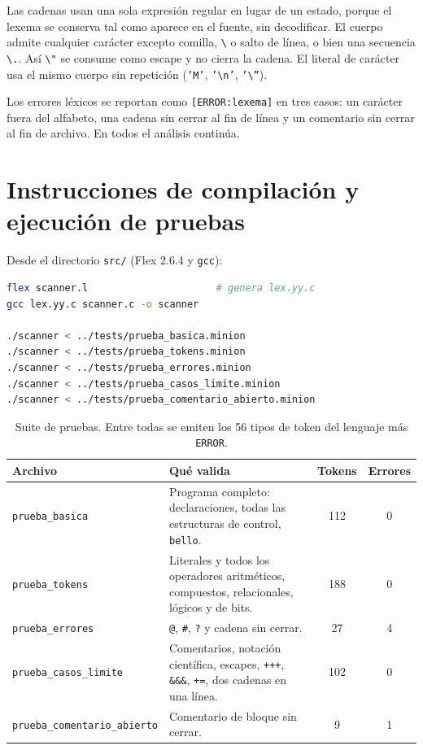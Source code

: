 \documentclass[11pt,letterpaper]{article}
\newcommand{\code}[1]{\texttt{#1}}
\begin{document}
Las cadenas usan una sola expresión regular en lugar de un estado, porque el lexema se conserva tal como aparece en el fuente, sin decodificar. El cuerpo admite cualquier carácter excepto comilla, \code{\textbackslash} o salto de línea, o bien una secuencia \code{\textbackslash.}. Así \code{\textbackslash"} se consume como escape y no cierra la cadena. El literal de carácter usa el mismo cuerpo sin repetición (\code{'M'}, \code{'\textbackslash n'}, \code{'\textbackslash''}).

Los errores léxicos se reportan como \code{[ERROR:lexema]} en tres casos: un carácter fuera del alfabeto, una cadena sin cerrar al fin de línea y un comentario sin cerrar al fin de archivo. En todos el análisis continúa.

\section{Instrucciones de compilación y ejecución de pruebas}

Desde el directorio \code{src/} (Flex 2.6.4 y \code{gcc}):

\begin{lstlisting}[language=bash,keywordstyle={}]
flex scanner.l                      # genera lex.yy.c
gcc lex.yy.c scanner.c -o scanner

./scanner < ../tests/prueba_basica.minion
./scanner < ../tests/prueba_tokens.minion
./scanner < ../tests/prueba_errores.minion
./scanner < ../tests/prueba_casos_limite.minion
./scanner < ../tests/prueba_comentario_abierto.minion
\end{lstlisting}

\begin{table}[H]
\centering\small
\begin{tabular}{l p{6.8cm} c c}
\toprule
\textbf{Archivo} & \textbf{Qué valida} & \textbf{Tokens} & \textbf{Errores}\\
\midrule
\code{prueba\_basica} & Programa completo: declaraciones, todas las estructuras de control, \code{bello}. & 112 & 0\\
\code{prueba\_tokens} & Literales y todos los operadores aritméticos, compuestos, relacionales, lógicos y de bits. & 188 & 0\\
\code{prueba\_errores} & \code{@}, \code{\#}, \code{?} y cadena sin cerrar. & 27 & 4\\
\code{prueba\_casos\_limite} & Comentarios, notación científica, escapes, \code{+++}, \code{\&\&\&}, \code{+=}, dos cadenas en una línea. & 102 & 0\\
\code{prueba\_comentario\_abierto} & Comentario de bloque sin cerrar. & 9 & 1\\
\bottomrule
\end{tabular}
\caption{Suite de pruebas. Entre todas se emiten los 56 tipos de token del lenguaje más \code{ERROR}.}
\end{table}
\end{document}
